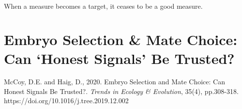 \begin{savequote}[70mm]
When a measure becomes a target, it ceases to be a good measure.
\end{savequote}

\chapter{Embryo  Selection  \&  Mate  Choice:  Can ‘Honest  Signals’ Be  Trusted?}

\newthought{\textcolor{SchoolColor}{Reprinted from:}}
McCoy, D.E. and Haig, D., 2020. Embryo Selection and Mate Choice: Can Honest Signals Be Trusted?. \emph{Trends in Ecology \& Evolution}, 35(4), pp.308-318.
\\
\newthought{\textcolor{SchoolColor}{Article and supplement available at:}} https://doi.org/10.1016/j.tree.2019.12.002